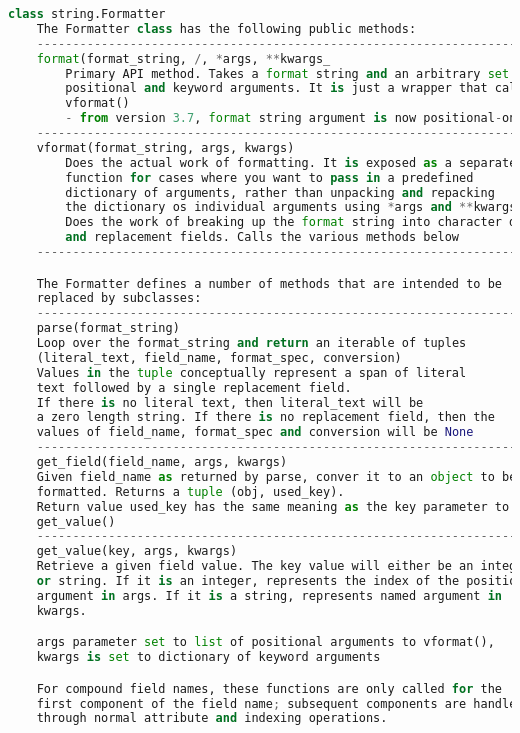 \documentclass[a4paper,landscape]{report}
\begin{document}
\begin{lstlisting}[language=Python]
class string.Formatter
    The Formatter class has the following public methods:
    ----------------------------------------------------------------------
    format(format_string, /, *args, **kwargs_
        Primary API method. Takes a format string and an arbitrary set of
        positional and keyword arguments. It is just a wrapper that calls
        vformat()
        - from version 3.7, format string argument is now positional-only
    ----------------------------------------------------------------------
    vformat(format_string, args, kwargs)
        Does the actual work of formatting. It is exposed as a separate
        function for cases where you want to pass in a predefined
        dictionary of arguments, rather than unpacking and repacking
        the dictionary os individual arguments using *args and **kwargs
        Does the work of breaking up the format string into character data
        and replacement fields. Calls the various methods below
    ----------------------------------------------------------------------

    The Formatter defines a number of methods that are intended to be
    replaced by subclasses:
    ----------------------------------------------------------------------
    parse(format_string)
    Loop over the format_string and return an iterable of tuples
    (literal_text, field_name, format_spec, conversion)
    Values in the tuple conceptually represent a span of literal
    text followed by a single replacement field.
    If there is no literal text, then literal_text will be
    a zero length string. If there is no replacement field, then the
    values of field_name, format_spec and conversion will be None
    ----------------------------------------------------------------------
    get_field(field_name, args, kwargs)
    Given field_name as returned by parse, conver it to an object to be
    formatted. Returns a tuple (obj, used_key).
    Return value used_key has the same meaning as the key parameter to
    get_value()
    ----------------------------------------------------------------------
    get_value(key, args, kwargs)
    Retrieve a given field value. The key value will either be an integer
    or string. If it is an integer, represents the index of the positional
    argument in args. If it is a string, represents named argument in
    kwargs.

    args parameter set to list of positional arguments to vformat(),
    kwargs is set to dictionary of keyword arguments

    For compound field names, these functions are only called for the
    first component of the field name; subsequent components are handled
    through normal attribute and indexing operations.


\end{lstlisting}
\end{document}
